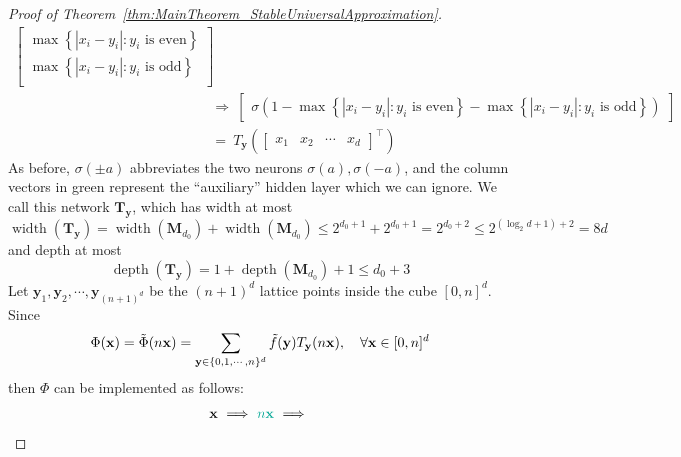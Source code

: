 \documentclass{article}
\numberwithin{equation}{section}
\theoremstyle{definition}
\begin{document}
\begin{proof}[{Proof of Theorem~\ref{thm:MainTheorem_StableUniversalApproximation}}]
\begin{align}
\begin{bmatrix}
    \max
    \left\{
        | x_i - y_i | :
        y_i \text{ is even}
    \right\}  \\ 
    \max
    \left\{
        | x_i - y_i | :
        y_i \text{ is odd}
    \right\}  \\ 
    \end{bmatrix} 
    \nonumber
    \\
    \ &\Longrightarrow \
    \begin{bmatrix}
        \sigma
        \left(
            1 - 
            \max
            \left\{
                | x_i - y_i | :
                y_i \text{ is even}
            \right\}
            -
            \max
            \left\{
                | x_i - y_i | :
                y_i \text{ is odd}
            \right\}
        \right)
    \end{bmatrix}  
    \nonumber
    \\
    \ &= \ 
    T_{\mathbf{y}}\left(
        \begin{bmatrix}
            x_1 & x_2 & \cdots & x_d
        \end{bmatrix}^{\top}
    \right)
\end{align}
As before, $\sigma(\pm a)$ abbreviates the two neurons $\sigma(a),\sigma(-a)$, and the column vectors in green represent the ``auxiliary'' hidden layer which we can ignore. We call this network $\mathbf{T}_{\mathbf{y}}$, which has width at most 
\begin{equation}
\label{eq:hat_width_bound}
    \operatorname{width}(\mathbf{T}_{\mathbf{y}})
    = 
    \operatorname{width}(\mathbf{M}_{d_0}) + 
    \operatorname{width}(\mathbf{M}_{d_0})
    \le 
    2^{d_0+1} + 2^{d_0+1} = 2^{d_0+2} \le 2^{(\log_2{d}+1)+2} = 8d
\end{equation}
and depth at most
\begin{equation}
\label{eq:hat_depth_bound}
    \operatorname{depth}(\mathbf{T}_{\mathbf{y}})
    = 1 + \operatorname{depth}(\mathbf{M}_{d_0}) + 1
    \le d_0 + 3
\end{equation}
Let $\mathbf{y}_1,\mathbf{y}_2,\cdots,\mathbf{y}_{(n+1)^d}$ be the $(n+1)^d$ lattice points inside the cube $[0,n]^d$. Since 
$$\Phi(\mathbf{x}) = \Tilde{\Phi}(n\mathbf{x}) 
= \sum_{
\mathbf{y}\in\{0,1,\cdots,n\}^d
}
\Tilde{f}(\mathbf{y})
T_{\mathbf{y}}(n\mathbf{x}),
\quad \forall \mathbf{x}\in[0,n]^d$$
then $\Phi$ can be implemented as follows: 
\begin{align}
\label{eq:phi_construction}
    \mathbf{x}
    \ \Longrightarrow \
    {\color{persiangreen}
    n\mathbf{x}
    }
    \ \Longrightarrow \

\end{align}
\end{proof}
\end{document}
